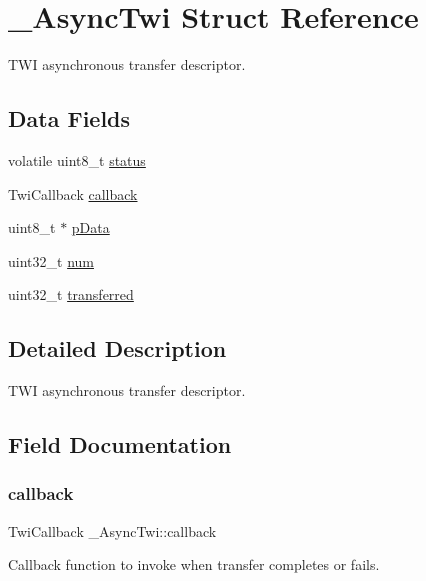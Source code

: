 \hypertarget{struct__AsyncTwi}{}\section{\+\_\+\+Async\+Twi Struct Reference}
\label{struct__AsyncTwi}


T\+WI asynchronous transfer descriptor.  


\subsection*{Data Fields}
\begin{DoxyCompactItemize}
\item 
volatile uint8\+\_\+t \mbox{\hyperlink{struct__AsyncTwi_ad7531ed0181cd614119811fa5b221fa9}{status}}
\item 
Twi\+Callback \mbox{\hyperlink{struct__AsyncTwi_aa0f2f0434881ad3c487a223a5ff4312b}{callback}}
\item 
uint8\+\_\+t $\ast$ \mbox{\hyperlink{struct__AsyncTwi_a4e824a77aa09700f93ee35d475166729}{p\+Data}}
\item 
uint32\+\_\+t \mbox{\hyperlink{struct__AsyncTwi_abe10613d30ef1cc4ff58729cd72a09ba}{num}}
\item 
uint32\+\_\+t \mbox{\hyperlink{struct__AsyncTwi_a5df6d1f444cbb84b919fc9444a1fa6a6}{transferred}}
\end{DoxyCompactItemize}


\subsection{Detailed Description}
T\+WI asynchronous transfer descriptor. 

\subsection{Field Documentation}
\mbox{\label{struct__AsyncTwi_aa0f2f0434881ad3c487a223a5ff4312b}} 
\subsubsection{\texorpdfstring{callback}{callback}}
{\footnotesize\ttfamily Twi\+Callback \+\_\+\+Async\+Twi\+::callback}

Callback function to invoke when transfer completes or fails. \mbox{\label{struct__AsyncTwi_abe10613d30ef1cc4ff58729cd72a09ba}} 
